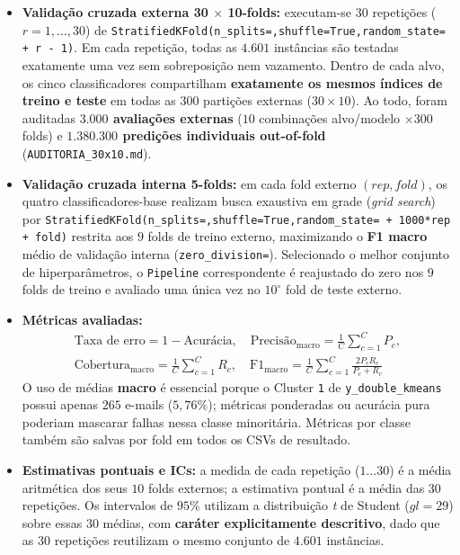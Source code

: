 \documentclass[a4paper,11pt]{article}
\begin{document}
\begin{itemize}[leftmargin=1.5em, itemsep=0.25em, topsep=0.25em]
  \item \textbf{Validação cruzada externa 30 $\times$ 10-folds:} executam-se $30$ repetições ($r = 1, \ldots, 30$) de \texttt{StratifiedKFold(\allowbreak n\_\allowbreak splits=,\allowbreak  shuffle=\allowbreak True,\allowbreak  random\_\allowbreak state= + r - 1)}. Em cada repetição, todas as $4.601$ instâncias são testadas exatamente uma vez sem sobreposição nem vazamento. Dentro de cada alvo, os cinco classificadores compartilham \textbf{exatamente os mesmos índices de treino e teste} em todas as $300$ partições externas ($30 \times 10$). Ao todo, foram auditadas \textbf{$3.000$ avaliações externas} ($10$ combinações alvo/modelo $\times 300$ folds) e \textbf{$1.380.300$ predições individuais out-of-fold} (\texttt{AUDITORIA\_\allowbreak 30x10.md}).
  \item \textbf{Validação cruzada interna 5-folds:} em cada fold externo $(rep, fold)$, os quatro classificadores-base realizam busca exaustiva em grade (\textit{grid search}) por \texttt{StratifiedKFold(\allowbreak n\_\allowbreak splits=,\allowbreak  shuffle=\allowbreak True,\allowbreak  random\_\allowbreak state= + 1000*rep + fold)} restrita aos $9$ folds de treino externo, maximizando o \textbf{F1 macro} médio de validação interna (\texttt{zero\_\allowbreak division=}). Selecionado o melhor conjunto de hiperparâmetros, o \texttt{Pipeline} correspondente é reajustado do zero nos $9$ folds de treino e avaliado uma única vez no $10^\circ$ fold de teste externo.
  \item \textbf{Métricas avaliadas:}
\begin{gather*}
\text{Taxa de erro} = 1 - \text{Acurácia}, \quad \text{Precisão}_{\text{macro}} = \frac{1}{C}\sum_{c=1}^{C} P_c, \\[0.4em] \text{Cobertura}_{\text{macro}} = \frac{1}{C}\sum_{c=1}^{C} R_c, \quad \text{F1}_{\text{macro}} = \frac{1}{C}\sum_{c=1}^{C} \frac{2 P_c R_c}{P_c + R_c}
\end{gather*}
O uso de médias \textbf{macro} é essencial porque o Cluster \texttt{1} de \texttt{y\_\allowbreak double\_\allowbreak kmeans} possui apenas $265$ e-mails ($5,76\%$); métricas ponderadas ou acurácia pura poderiam mascarar falhas nessa classe minoritária. Métricas por classe também são salvas por fold em todos os CSVs de resultado.
  \item \textbf{Estimativas pontuais e ICs:} a medida de cada repetição ($1 \ldots 30$) é a média aritmética dos seus $10$ folds externos; a estimativa pontual é a média das $30$ repetições. Os intervalos de $95\%$ utilizam a distribuição \textit{t} de Student ($gl = 29$) sobre essas $30$ médias, com \textbf{caráter explicitamente descritivo}, dado que as $30$ repetições reutilizam o mesmo conjunto de $4.601$ instâncias.
\end{itemize}
\end{document}
